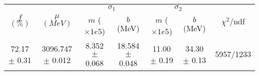 \begin{tabular}{c|c|cc|cc||c}
 \multirow{2}{*}{$f$ $(\%)$} & \multirow{2}{*}{$\mu$ $(MeV)$} & \multicolumn{2}{|c|}{$\sigma_1$} & \multicolumn{2}{|c||}{$\sigma_2$} & \multirow{2}{*}{$\chi^2/$ndf} \\
 & & $m$ ($\times1e5$) & $b$ (MeV) & $m$ ($\times1e5$) & $b$ (MeV) & \\
\hline
72.17 $\pm$ 0.31 & 3096.747 $\pm$ 0.012 & 8.352 $\pm$ 0.068 & 18.584 $\pm$ 0.048 & 11.00 $\pm$ 0.19 & 34.30 $\pm$ 0.13 & 5957/1233\\
\end{tabular}
